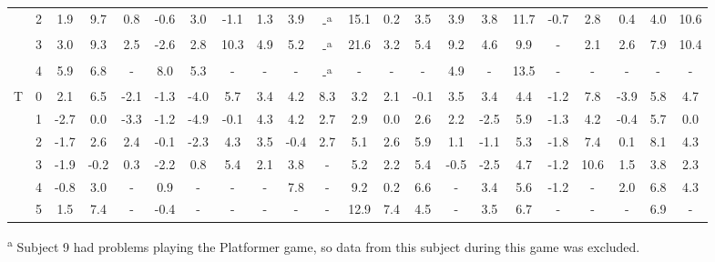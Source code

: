\begin{table*}[!t]
{\begin{tabular}{|c|c|c|c|c|c|c|c|c|c|c|c|c|c|c|c|c|c|c|c|c|c|}
                      & 2   & 1.9  & 9.7  & 0.8  & -0.6 & 3.0   & -1.1 & 1.3  & 3.9  & -\textsuperscript{a}   & 15.1 & 0.2   & 3.5    & 3.9  & 3.8  & 11.7 & -0.7 & 2.8  & 0.4  & 4.0  & 10.6 \\
                      & 3   & 3.0  & 9.3  & 2.5  & -2.6 & 2.8   & 10.3 & 4.9  & 5.2  & -\textsuperscript{a}   & 21.6 & 3.2   & 5.4    & 9.2  & 4.6  & 9.9  & -    & 2.1  & 2.6  & 7.9  & 10.4 \\
                      & 4   & 5.9  & 6.8  & -    & 8.0  & 5.3   & -    & -    & -    & -\textsuperscript{a}   & -    & -     & -      & 4.9  & -    & 13.5 & -    & -    & -    & -    & -     \\
\hline
\multirow{6}{*}{T}    & 0   & 2.1  & 6.5  & -2.1 & -1.3 & -4.0  & 5.7  & 3.4  & 4.2  & 8.3  & 3.2  & 2.1   & -0.1  & 3.5  & 3.4  & 4.4  & -1.2 & 7.8  & -3.9 & 5.8  & 4.7  \\
                      & 1   & -2.7 & 0.0  & -3.3 & -1.2 & -4.9  & -0.1 & 4.3  & 4.2  & 2.7  & 2.9  & 0.0   & 2.6   & 2.2  & -2.5 & 5.9  & -1.3 & 4.2  & -0.4 & 5.7  & 0.0 \\
                      & 2   & -1.7 & 2.6  & 2.4  & -0.1 & -2.3  & 4.3  & 3.5  & -0.4 & 2.7  & 5.1  & 2.6   & 5.9   & 1.1  & -1.1 & 5.3  & -1.8 & 7.4  & 0.1  & 8.1  & 4.3  \\
                      & 3   & -1.9 & -0.2 & 0.3  & -2.2 & 0.8   & 5.4  & 2.1  & 3.8  & -    & 5.2  & 2.2   & 5.4   & -0.5 & -2.5 & 4.7  & -1.2 & 10.6 & 1.5  & 3.8  & 2.3  \\
                      & 4   & -0.8 & 3.0  & -    & 0.9  & -     & -    & -    & 7.8  & -    & 9.2  & 0.2   & 6.6   & -    & 3.4  & 5.6  & -1.2 & -    & 2.0  & 6.8  & 4.3  \\
                      & 5   & 1.5  & 7.4  & -    & -0.4 & -     & -    & -    & -    & -    & 12.9 & 7.4   & 4.5   & -    & 3.5  & 6.7  & -    & -    & -    & 6.9  & -    \\
\hline
\end{tabular}
}
\raggedright{\textsuperscript{a} Subject 9 had problems playing the Platformer game, so data from this subject during this game was excluded.}
\end{table*}

